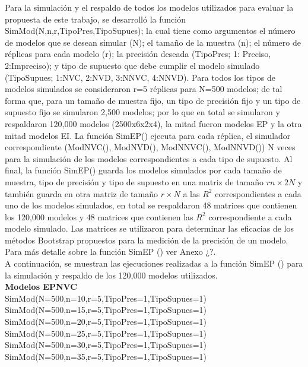 Para la simulación y el respaldo de todos los modelos utilizados para evaluar la propuesta de este trabajo, se desarrolló la función SimMod(N,n,r,TipoPres,TipoSupues); la cual tiene como argumentos el número de modelos que se desean simular (N); el tamaño de la muestra (n); el número de réplicas para cada modelo (r);  la precisión deseada (TipoPres; 1: Preciso, 2:Impreciso); y tipo de supuesto que debe cumplir el modelo simulado (TipoSupues; 1:NVC, 2:NVD, 3:NNVC, 4:NNVD). Para todos los tipos de modelos simulados se consideraron r=5 réplicas para N=500 modelos; de tal forma que, para un tamaño de muestra fijo, un tipo de precisión fijo y un tipo de supuesto fijo se simularon 2,500 modelos; por lo que en total se simularon y respaldaron 120,000 modelos (2500x6x2x4), la mitad fueron modelos EP y la otra mitad modelos EI.
La función SimEP() ejecuta para cada réplica, el simulador correspondiente (ModNVC(), ModNVD(), ModNNVC(), ModNNVD())  N veces para la simulación de los modelos correspondientes a cada tipo de supuesto. Al final, la función SimEP() guarda los modelos simulados por cada tamaño de muestra, tipo de precisión y tipo de supuesto en una matriz de tamaño $rn \times 2N$ y también guarda en otra matriz de tamaño $r \times N$ a las $R^2$ correspondientes a cada uno de los modelos simulados, en total se respaldaron 48 matrices que contienen los 120,000 modelos y 48 matrices que contienen las $R^2$ correspondiente a cada modelo simulado. Las matrices se utilizaron para determinar las eficacias de los métodos Bootstrap propuestos para la medición de la precisión de un modelo. Para más detalle sobre la función SimEP () ver Anexo ¿?.\\


A continuación, se muestran las ejecuciones realizadas a la función SimEP () para la simulación y respaldo de los 120,000 modelos utilizados. \\


\textbf{Modelos EPNVC}\\
SimMod(N=500,n=10,r=5,TipoPres=1,TipoSupues=1)\\
SimMod(N=500,n=15,r=5,TipoPres=1,TipoSupues=1)\\
SimMod(N=500,n=20,r=5,TipoPres=1,TipoSupues=1)\\
SimMod(N=500,n=25,r=5,TipoPres=1,TipoSupues=1)\\
SimMod(N=500,n=30,r=5,TipoPres=1,TipoSupues=1)\\
SimMod(N=500,n=35,r=5,TipoPres=1,TipoSupues=1)\\

